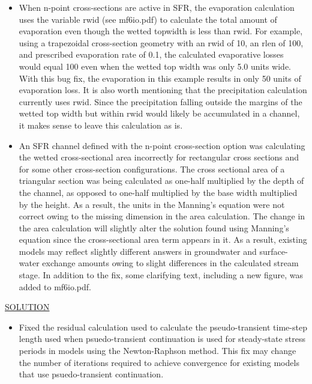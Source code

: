 \begin{itemize}
		\item When n-point cross-sections are active in SFR, the evaporation calculation uses the variable rwid (see mf6io.pdf) to calculate the total amount of evaporation even though the wetted topwidth is less than rwid.  For example, using a trapezoidal cross-section geometry with an rwid of 10, an rlen of 100, and prescribed evaporation rate of 0.1, the calculated evaporative losses would equal 100 even when the wetted top width was only 5.0 units wide.  With this bug fix, the evaporation in this example results in only 50 units of evaporation loss.  It is also worth mentioning that the precipitation calculation currently uses rwid.  Since the precipitation falling outside the margins of the wetted top width but within rwid would likely be accumulated in a channel, it makes sense to leave this calculation as is.
		\item An SFR channel defined with the n-point cross-section option was calculating the wetted cross-sectional area incorrectly for rectangular cross sections and for some other cross-section configurations. The cross sectional area of a triangular section was being calculated as one-half multiplied by the depth of the channel, as opposed to one-half multiplied by the base width multiplied by the height. As a result, the units in the Manning's equation were not correct owing to the missing dimension in the area calculation.  The change in the area calculation will slightly alter the solution found using Manning's equation since the cross-sectional area term appears in it.  As a result, existing models may reflect slightly different answers in groundwater and surface-water exchange amounts owing to slight differences in the calculated stream stage.  In addition to the fix, some clarifying text, including a new figure, was added to mf6io.pdf.
	\end{itemize}

	\underline{SOLUTION}
	\begin{itemize}
		\item Fixed the residual calculation used to calculate the pseudo-transient time-step length used when psuedo-transient continuation is used for steady-state stress periods in models using the Newton-Raphson method. This fix may change the number of iterations required to achieve convergence for existing models that use psuedo-transient continuation. 
	\end{itemize}


